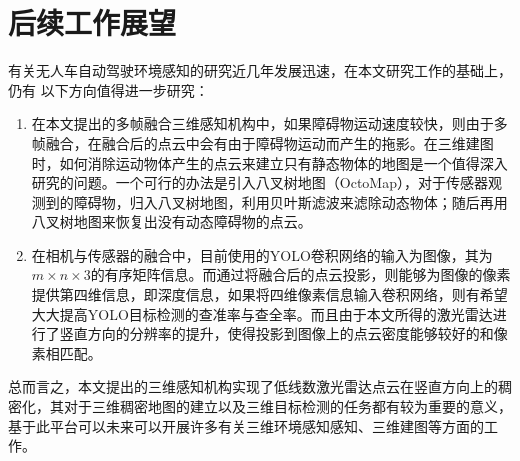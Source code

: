 \section{后续工作展望}
有关无人车自动驾驶环境感知的研究近几年发展迅速，在本文研究工作的基础上，仍有
以下方向值得进一步研究：
\begin{enumerate}
    \item 在本文提出的多帧融合三维感知机构中，如果障碍物运动速度较快，则由于多帧融合，在融合后的点云中会有由于障碍物运动而产生的拖影。在三维建图时，如何消除运动物体产生的点云来建立只有静态物体的地图是一个值得深入研究的问题。一个可行的办法是引入八叉树地图（OctoMap），对于传感器观测到的障碍物，归入八叉树地图，利用贝叶斯滤波来滤除动态物体；随后再用八叉树地图来恢复出没有动态障碍物的点云。
    \item 在相机与传感器的融合中，目前使用的YOLO卷积网络的输入为图像，其为$m\times n\times 3$的有序矩阵信息。而通过将融合后的点云投影，则能够为图像的像素提供第四维信息，即深度信息，如果将四维像素信息输入卷积网络，则有希望大大提高YOLO目标检测的查准率与查全率。而且由于本文所得的激光雷达进行了竖直方向的分辨率的提升，使得投影到图像上的点云密度能够较好的和像素相匹配。
\end{enumerate}
总而言之，本文提出的三维感知机构实现了低线数激光雷达点云在竖直方向上的稠密化，其对于三维稠密地图的建立以及三维目标检测的任务都有较为重要的意义，基于此平台可以未来可以开展许多有关三维环境感知感知、三维建图等方面的工作。